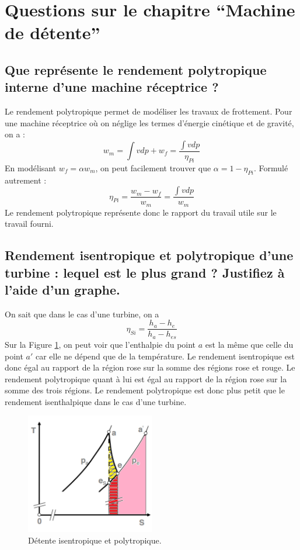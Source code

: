 \section{Questions sur le chapitre ``Machine de détente''}
\subsection{Que représente le rendement polytropique interne d'une machine réceptrice ?}
Le rendement polytropique permet de modéliser les travaux de frottement. Pour une machine réceptrice où on néglige les termes d'énergie cinétique et de gravité, on a :
\begin{equation} w_m = \int vdp + w_f = \frac{\int vdp}{\eta_{Pi}} \end{equation}
En modélisant $w_f = \alpha w_m$, on peut facilement trouver que $\alpha = 1-\eta_{Pi}$. Formulé autrement :
\begin{equation} \eta_{Pi} = \frac{w_m-w_f}{w_m} = \frac{\int vdp}{w_m} \end{equation}
Le rendement polytropique représente donc le rapport du travail utile sur le travail fourni.

\subsection{Rendement isentropique et polytropique d'une turbine : lequel est le plus grand ? Justifiez à l'aide d'un graphe.}
On sait que dans le cas d'une turbine, on a 
\begin{equation} \eta_{Si} = \frac{h_a-h_e}{h_a-h_{es}} \end{equation}
Sur la Figure \ref{fig:isenpoly}, on peut voir que l'enthalpie du point $a$ est la même que celle du point $a'$ car elle ne dépend que de la température. Le rendement isentropique est donc égal au rapport de la région rose sur la somme des régions rose et rouge. 
Le rendement polytropique quant à lui est égal au rapport de la région rose sur la somme des trois régions. Le rendement polytropique est donc plus petit que le rendement isenthalpique dans le cas d'une turbine. 
\begin{figure}[h]\centering
	\includegraphics[width=0.5\textwidth]{figures/isenpoly.png}
	\caption{Détente isentropique et polytropique.}
	\label{fig:isenpoly}
\end{figure}
